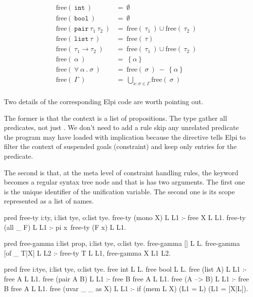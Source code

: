 \documentclass[a4paper, 11pt]{book}
\begin{document}
$$
\begin{array}{ll}
  \text{free}(\ \mathtt{int}\ ) &=\ \emptyset\\
  \text{free}(\ \mathtt{bool}\ ) &=\ \emptyset\\
  \text{free}(\ \mathtt{pair}\ \tau_1\ \tau_2\ ) &=\ \text{free}(\ \tau_1\ )\cup \text{free}(\ \tau_2\ ) \\
  \text{free}(\ \mathtt{list}\ \tau\ ) &=\ \text{free}(\ \tau ) \\
  \text{free}(\ \tau_1 \to \tau_2\ ) &=\ \text{free}(\ \tau_1\ )\cup \text{free}(\ \tau_2\ ) \\
  \text{free}(\ \alpha\ ) &=\ \left\{\alpha\right\}\\
  \text{free}(\ \forall\ \alpha\ .\ \sigma\ ) &=\ \text{free}(\ \sigma\ )\  -\  \left\{\alpha\right\}\\
  \text{free}(\ \Gamma\ ) &=\ \bigcup\limits_{x:\sigma \in \Gamma}\text{free}(\ \sigma\ )\\
\end{array}
$$

Two details of the corresponding Elpi code are worth pointing out.

The former is that the context is a list of propositions. The 
type gather all predicates, not just . We don't need to add
a rule skip any unrelated predicate the program may have loaded with implication
because the  directive
tells Elpi to filter the context of suspended goals (constraint) and keep only
entries for the  predicate.

The second is that, at the meta level of constraint handling rules, the
 keyword becomes a regular syntax tree node and that is
has two arguments. The first one is the unique identifier of the unification
variable. The second one is its scope represented as a list of names.
  

\begin{elpicode}
pred free-ty i:ty, i:list tye, o:list tye.
free-ty (mono X) L L1 :- free X L L1.
free-ty (all _ F) L L1 :- pi x\ free-ty (F x) L L1.

pred free-gamma i:list prop, i:list tye, o:list tye.
free-gamma [] L L.
free-gamma [of _ T|X] L L2 :- free-ty T L L1, free-gamma X L1 L2.

pred free i:tye, i:list tye, o:list tye.
free int L L.
free bool L L.
free (list A) L L1 :- free A L L1.
free (pair A B) L L1 :- free B {free A L} L1.
free (A --> B) L L1 :- free B {free A L} L1.
free (uvar _ _ as X) L L1 :- if (mem L X) (L1 = L) (L1 = [X|L]).
\end{elpicode}
\end{document}
